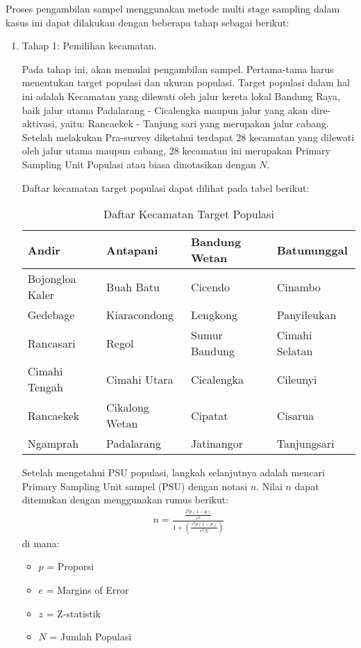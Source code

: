 \documentclass{article}
\begin{document}
Proses pengambilan sampel menggunakan metode multi stage sampling dalam kasus ini dapat dilakukan dengan beberapa tahap sebagai berikut:

\begin{enumerate}
    \item Tahap 1: Pemilihan kecamatan. 
    
    \par\noindent
    Pada tahap ini, akan memulai pengambilan sampel. Pertama-tama harus menentukan target populasi dan ukuran populasi. Target populasi dalam hal ini adalah Kecamatan yang dilewati oleh jalur kereta lokal Bandung Raya, baik jalur utama Padalarang - Cicalengka maupun jalur yang akan dire-aktivasi, yaitu: Rancaekek - Tanjung sari yang merupakan jalur cabang. Setelah melakukan Pra-survey diketahui terdapat 28 kecamatan yang dilewati oleh jalur utama maupun cabang, 28 kecamatan ini merupakan Primary Sampling Unit Populasi atau biasa dinotasikan dengan $N$.

    
    \par\noindent
    Daftar kecamatan target populasi dapat dilihat pada tabel berikut:
    \begin{table}[ht]
        \centering
        \caption{Daftar Kecamatan Target Populasi}
        \label{tabel:psu_populasi}
        \begin{tabular}{|p{3cm}|p{3cm}|p{3cm}|p{3cm}|}
        \hline
        Andir & Antapani & Bandung Wetan & Batununggal \\ \hline
        Bojongloa Kaler & Buah Batu & Cicendo & Cinambo \\ \hline
        Gedebage & Kiaracondong & Lengkong & Panyileukan \\ \hline
        Rancasari & Regol & Sumur Bandung & Cimahi Selatan \\ \hline
        Cimahi Tengah & Cimahi Utara & Cicalengka & Cileunyi \\ \hline
        Rancaekek & Cikalong Wetan & Cipatat & Cisarua \\ \hline
        Ngamprah & Padalarang & Jatinangor & Tanjungsari \\ \hline
        \end{tabular}
\end{table}

Setelah mengetahui PSU populasi, langkah selanjutnya adalah mencari Primary Sampling Unit sampel (PSU) dengan notasi $n$. Nilai $n$ dapat ditemukan dengan menggunakan rumus berikut:
\begin{align}
    n = \frac{\frac{z^{2}p(1-p)}{e^{2}}}{1 + \left(\frac{z^{2}p(1-p)}{e^{2}N}\right)}
\end{align}
di mana:
\begin{itemize}
    \item $p$ = Proporsi
    \item $e$ = Margins of Error
    \item $z$ = Z-statistik
    \item $N$ = Jumlah Populasi
\end{itemize}


\end{enumerate}
\end{document}
